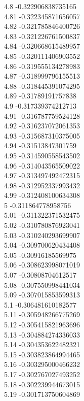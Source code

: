 {4.8	-0.322906838735165\\
4.81	-0.322345871656057\\
4.82	-0.321785846400726\\
4.83	-0.321226761500837\\
4.84	-0.320668615489957\\
4.85	-0.320111406903552\\
4.86	-0.319555134278983\\
4.87	-0.318999796155513\\
4.88	-0.318445391074295\\
4.89	-0.31789191757838\\
4.9	-0.317339374212713\\
4.91	-0.316787759524128\\
4.92	-0.316237072061353\\
4.93	-0.315687310375005\\
4.94	-0.31513847301759\\
4.95	-0.314590558543502\\
4.96	-0.314043565509022\\
4.97	-0.313497492472315\\
4.98	-0.312952337993432\\
4.99	-0.312408100634308\\
5	-0.311864778958756\\
5.01	-0.311322371532475\\
5.02	-0.310780876923041\\
5.03	-0.310240293699907\\
5.04	-0.309700620434408\\
5.05	-0.30916185569975\\
5.06	-0.308623998071019\\
5.07	-0.30808704612517\\
5.08	-0.307550998441034\\
5.09	-0.307015853599313\\
5.1	-0.306481610182577\\
5.11	-0.305948266775269\\
5.12	-0.305415821963696\\
5.13	-0.304884274336033\\
5.14	-0.304353622482321\\
5.15	-0.303823864994465\\
5.16	-0.303295000466232\\
5.17	-0.302767027493252\\
5.18	-0.302239944673015\\
5.19	-0.301713750604869\\
}
